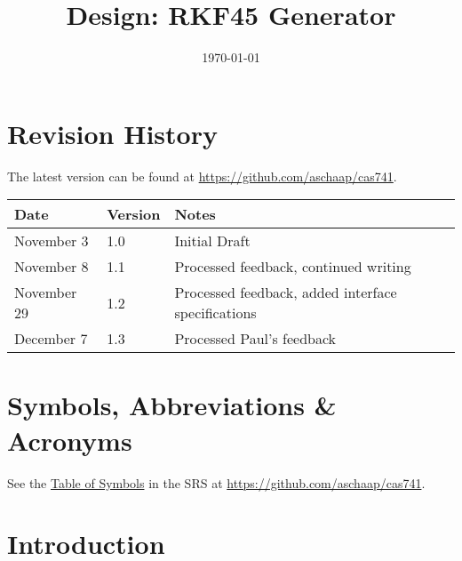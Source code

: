 \documentclass[12pt, titlepage]{article}
\begin{document}
\title{Design: RKF45 Generator} 
\date{\today}

\maketitle


\section{Revision History}

The latest version can be found at \url{https://github.com/aschaap/cas741}.\\

\noindent
\begin{tabularx}{\textwidth}{p{3cm}p{2cm}X}
\toprule {\bf Date} & {\bf Version} & {\bf Notes}\\
\midrule
November 3 & 1.0 & Initial Draft\\
November 8 & 1.1 & Processed feedback, continued writing\\
November 29 & 1.2 & Processed feedback, added interface specifications\\
December 7 & 1.3 & Processed Paul's feedback\\
\bottomrule
\end{tabularx}

\newpage

\section{Symbols, Abbreviations \& Acronyms}
See the \href{../SRS/CA.pdf#ssec:symbols}{Table of Symbols} in the SRS at 
\url{https://github.com/aschaap/cas741}.


\newpage

\tableofcontents

%

\newpage


\section{Introduction}

\end{document}
